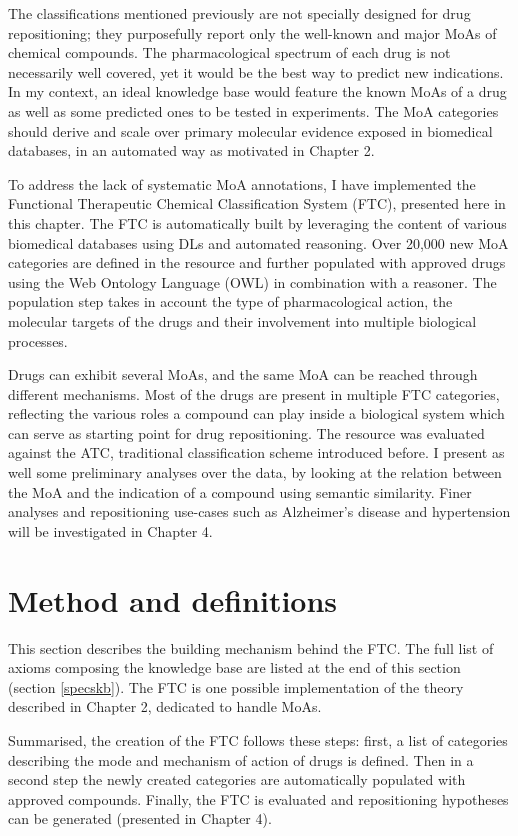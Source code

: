 The classifications mentioned previously are not specially designed for drug repositioning; they purposefully report only the well-known and major MoAs of chemical compounds. The pharmacological spectrum of each drug is not necessarily well covered, yet it would be the best way to predict new indications. In my context, an ideal knowledge base would feature the known MoAs of a drug as well as some predicted ones to be tested in experiments. The MoA categories should derive and scale over primary molecular evidence exposed in biomedical databases, in an automated way as motivated in Chapter 2.

To address the lack of systematic MoA annotations, I have implemented the Functional Therapeutic Chemical Classification System (FTC), presented here in this chapter. The FTC is automatically built by leveraging the content of various biomedical databases using DLs and automated reasoning. Over 20,000 new MoA categories are defined in the resource and further populated with approved drugs using the Web Ontology Language (OWL) in combination with a reasoner. The population step takes in account the type of pharmacological action, the molecular targets of the drugs and their involvement into multiple biological processes.

Drugs can exhibit several MoAs, and the same MoA can be reached through different mechanisms. Most of the drugs are present in multiple FTC categories, reflecting the various roles a compound can play inside a biological system which can serve as starting point for drug repositioning. The resource was evaluated against the ATC, traditional classification scheme introduced before. I present as well some preliminary analyses over the data, by looking at the relation between the MoA and the indication of a compound using semantic similarity. Finer analyses and repositioning use-cases such as Alzheimer's disease and hypertension will be investigated in Chapter 4.

\section{Method and definitions}
\label{method}

This section describes the building mechanism behind the FTC. The full list of axioms composing the knowledge base are listed at the end of this section (section \ref{specskb}). The FTC is one possible implementation of the theory described in Chapter 2, dedicated to handle MoAs.

Summarised, the creation of the FTC follows these steps: first, a list of categories describing the mode and mechanism of action of drugs is defined. Then in a second step the newly created categories are automatically populated with approved compounds. Finally, the FTC is evaluated and repositioning hypotheses can be generated (presented in Chapter 4).

